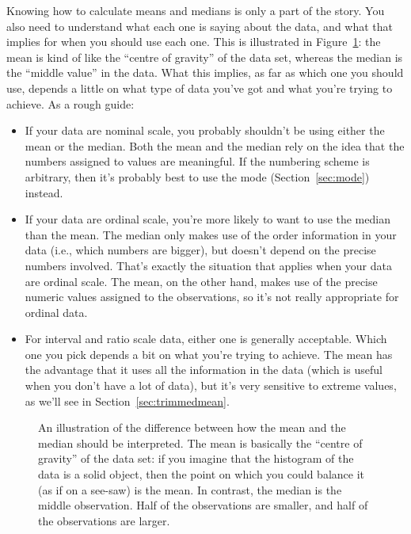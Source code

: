 
Knowing how to calculate means and medians is only a part of the story. You also need to understand what each one is saying about the data, and what that implies for when you should use each one. This is illustrated in Figure~\ref{fig:meanmedian}: the mean is kind of like the ``centre of gravity'' of the data set, whereas the median is the ``middle value'' in the data. What this implies, as far as which one you should use, depends a little on what type of data you've got and what you're trying to achieve. As a rough guide:
\begin{itemize} 
\item If your data are nominal scale, you probably shouldn't be using either the mean or the median. Both the mean and the median rely on the idea that the numbers assigned to values are meaningful. If the numbering scheme is arbitrary, then it's probably best to use the mode (Section~\ref{sec:mode}) instead. 
\item If your data are ordinal scale, you're more likely to want to use the median than the mean. The median only makes use of the order information in your data (i.e., which numbers are bigger), but doesn't depend on the precise numbers involved. That's exactly the situation that applies when your data are ordinal scale. The mean, on the other hand, makes use of the precise numeric values assigned to the observations, so it's not really appropriate for ordinal data.
\item For interval and ratio scale data, either one is generally acceptable. Which one you pick depends a bit on what you're trying to achieve. The mean has the advantage that it uses all the information in the data (which is useful when you don't have a lot of data), but it's very sensitive to extreme values, as we'll see in Section~\ref{sec:trimmedmean}.  
\end{itemize}

\vspace*{1cm}
\begin{figure}[h]
\begin{center}
\caption{An illustration of the difference between how the mean and the median should be interpreted. The mean is basically the ``centre of gravity'' of the data set: if you imagine that the histogram of the data is a solid object, then the point on which you could balance it (as if on a see-saw) is the mean. In contrast, the median is the middle observation. Half of the observations are smaller, and half of the observations are larger.}
\HR
\label{fig:meanmedian}
\end{center}
\end{figure}

